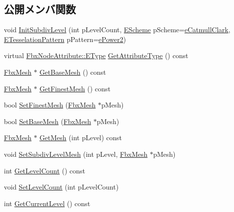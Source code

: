 \subsection*{公開メンバ関数}
\begin{DoxyCompactItemize}
\item 
void \hyperlink{class_fbx_sub_div_aef825ae0a9a2c6973f0cc632f8f1fe43}{Init\+Subdiv\+Level} (int p\+Level\+Count, \hyperlink{class_fbx_sub_div_aecdd4fdebb20f2796363989eba8ee9f5}{E\+Scheme} p\+Scheme=\hyperlink{class_fbx_sub_div_aecdd4fdebb20f2796363989eba8ee9f5a704e0c326608197ed346cae170291408}{e\+Catmull\+Clark}, \hyperlink{class_fbx_sub_div_a06cb3da0d9b384dc83585caa49f46684}{E\+Tesselation\+Pattern} p\+Pattern=\hyperlink{class_fbx_sub_div_a06cb3da0d9b384dc83585caa49f46684a9f9be689f1d831d329f4ea19d672ac63}{e\+Power2})
\item 
virtual \hyperlink{class_fbx_node_attribute_a08e1669d3d1a696910756ab17de56d6a}{Fbx\+Node\+Attribute\+::\+E\+Type} \hyperlink{class_fbx_sub_div_ac109cef6a177563eab80e28d414289a3}{Get\+Attribute\+Type} () const
\item 
\hyperlink{class_fbx_mesh}{Fbx\+Mesh} $\ast$ \hyperlink{class_fbx_sub_div_a8b14dd17531d8e7e970a0f27061c992c}{Get\+Base\+Mesh} () const
\item 
\hyperlink{class_fbx_mesh}{Fbx\+Mesh} $\ast$ \hyperlink{class_fbx_sub_div_aa3a7a320d1a1800ae4d59bd372a4beb0}{Get\+Finest\+Mesh} () const
\item 
bool \hyperlink{class_fbx_sub_div_a2205b6c841b523ff9bf80cc473a7aa4e}{Set\+Finest\+Mesh} (\hyperlink{class_fbx_mesh}{Fbx\+Mesh} $\ast$p\+Mesh)
\item 
bool \hyperlink{class_fbx_sub_div_aedeac30c9b067676bfbeb7ba95015ad6}{Set\+Base\+Mesh} (\hyperlink{class_fbx_mesh}{Fbx\+Mesh} $\ast$p\+Mesh)
\item 
\hyperlink{class_fbx_mesh}{Fbx\+Mesh} $\ast$ \hyperlink{class_fbx_sub_div_a705af0c50cdd202b19bdce9c36d90f01}{Get\+Mesh} (int p\+Level) const
\item 
void \hyperlink{class_fbx_sub_div_a6185a554b2c8f5718631a62a8f6656b8}{Set\+Subdiv\+Level\+Mesh} (int p\+Level, \hyperlink{class_fbx_mesh}{Fbx\+Mesh} $\ast$p\+Mesh)
\item 
int \hyperlink{class_fbx_sub_div_a645409b53d249062c2a22c224d27287a}{Get\+Level\+Count} () const
\item 
void \hyperlink{class_fbx_sub_div_a6ddec560144de0e8cc18ebf4c56ede8a}{Set\+Level\+Count} (int p\+Level\+Count)
\item 
int \hyperlink{class_fbx_sub_div_a76ae5f09e9af063bfdfa8bbbcdcf5b33}{Get\+Current\+Level} () const

\end{DoxyCompactItemize}
